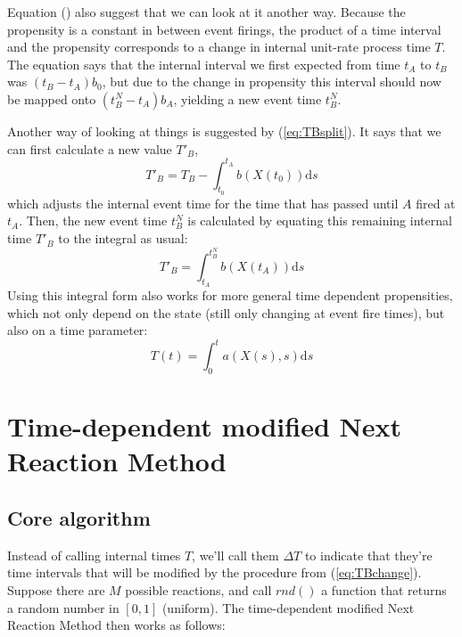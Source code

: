 \documentclass[a4paper,11pt]{article}
\newcommand{\ud}{\mathrm{d}}
\begin{document}
		Equation (\label{eq:internaltimes}) also suggest that we can look at it another way. Because the
		propensity is a constant in between event firings, the product of a time interval and the propensity
		corresponds to a change in internal unit-rate process time $T$. The equation says that the internal
		interval we first expected from time $t_A$ to $t_B$ was $(t_B-t_A) b_0$, but due to the change in
		propensity this interval should now be mapped onto $(t_B^N-t_A) b_A$, yielding a new event time $t_B^N$.

		Another way of looking at things is suggested by (\ref{eq:TBsplit}). It says that we can first calculate
		a new value $T'_B$,
		\begin{equation}
			T'_B = T_B - \int_{t_0}^{t_A} b(X(t_0)) \ud s
			\label{eq:TBchange}
	 	\end{equation}
		which adjusts the internal event time for the time that has passed until $A$ fired at $t_A$. Then, the
		new event time $t_B^N$ is calculated by equating this remaining internal time $T'_B$ to the
		integral as usual:
		\[ T'_B = \int_{t_A}^{t_B^N} b(X(t_A)) \ud s \]
		Using this integral form also works for more general time dependent propensities, which not only depend
		on the state (still only changing at event fire times), but also on a time parameter:
		\[ T(t) = \int_0^t a(X(s),s) \ud s \]

	\section{Time-dependent modified Next Reaction Method}

		\subsection{Core algorithm}

			Instead of calling internal times $T$, we'll call them $\Delta T$ to indicate that they're time intervals that will be modified by the procedure from (\ref{eq:TBchange}). Suppose there are $M$
			possible reactions, and call $rnd()$ a function that returns a random number in $[0,1]$ (uniform).
			The time-dependent modified Next Reaction Method then works as follows:
		
\end{document}
